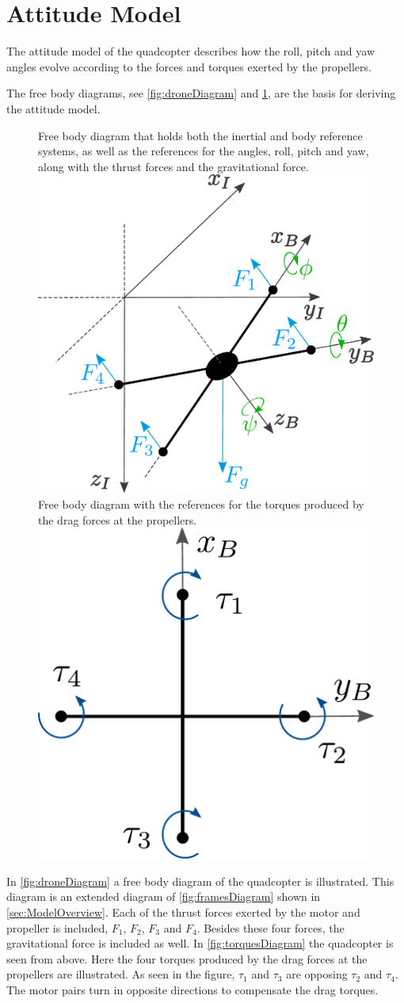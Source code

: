 \section{Attitude Model} \label{sec:AttitudeModel}
The attitude model of the quadcopter describes how the roll, pitch and yaw angles evolve according to the forces and torques exerted by the propellers. 

The free body diagrams, see \autoref{fig:droneDiagram} and \ref{fig:torquesDiagram}, are the basis for deriving the attitude model.
\vspace{-0.3 cm}
\begin{figure}[H]
  \captionbox
  {
    Free body diagram that holds both the inertial and body reference systems, as well as the references for the angles, roll, pitch and yaw, along with the thrust forces and the gravitational force.
    \label{fig:droneDiagram}
  }
  {
    \includegraphics[width=.48\textwidth]{figures/droneDiagram}
  }
  \hspace{5pt}
  \captionbox
  {
    Free body diagram with the references for the torques produced by the drag forces at the propellers.
    \label{fig:torquesDiagram}
  }
  {
    \includegraphics[width=.42\textwidth]{figures/torquesDiagram}
    \vspace{.5cm}
  }
\end{figure}
\vspace{-0.5 cm}
In \autoref{fig:droneDiagram} a free body diagram of the quadcopter is illustrated. This diagram is an extended diagram of \autoref{fig:framesDiagram} shown in \autoref{sec:ModelOverview}. Each of the thrust forces exerted by the motor and propeller is included, $F_1$, $F_2$, $F_3$ and $F_4$. Besides these four forces, the gravitational force is included as well. In \autoref{fig:torquesDiagram} the quadcopter is seen from above. Here the four torques produced by the drag forces at the propellers are illustrated. As seen in the figure, $\tau_1$ and $\tau_3$ are opposing $\tau_2$ and $\tau_4$. The motor pairs turn in opposite directions to compensate the drag torques.

